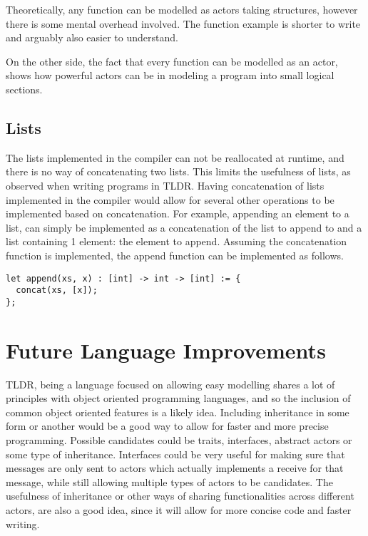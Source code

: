 Theoretically, any function can be modelled as actors taking structures, however there is some mental overhead involved. The function example is shorter to write and arguably also easier to understand. 

On the other side, the fact that every function can be modelled as an actor, shows how powerful actors can be in modeling a program into small logical sections.

\subsection{Lists}

The lists implemented in the compiler can not be reallocated at runtime, and there is no way of concatenating two lists. This limits the usefulness of lists, as observed when writing programs in TLDR. Having concatenation of lists implemented in the compiler would allow for several other operations to be implemented based on concatenation. For example, appending an element to a list, can simply be implemented as a concatenation of the list to append to and a list containing 1 element: the element to append. Assuming the concatenation function is implemented, the append function can be implemented as follows.

\begin{lstlisting}[caption = {Implementation of the append function based on the concatenation function.}]
let append(xs, x) : [int] -> int -> [int] := {
  concat(xs, [x]);
};
\end{lstlisting}

\section{Future Language Improvements}

TLDR, being a language focused on allowing easy modelling shares a lot of principles with object oriented programming languages, and so the inclusion of common object oriented features is a likely idea. Including inheritance in some form or another would be a good way to allow for faster and more precise programming. Possible candidates could be traits, interfaces, abstract actors or some type of inheritance. Interfaces could be very useful for making sure that messages are only sent to actors which actually implements a receive for that message, while still allowing multiple types of actors to be candidates. The usefulness of inheritance or other ways of sharing functionalities across different actors, are also a good idea, since it will allow for more concise code and faster writing.

